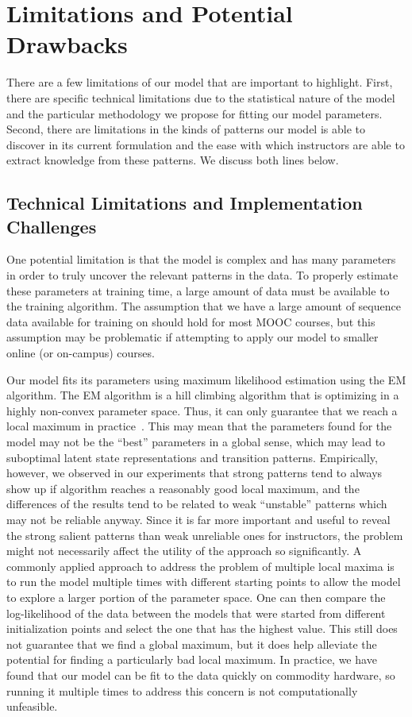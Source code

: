 \section{Limitations and Potential Drawbacks}

There are a few limitations of our model that are important to highlight.
First, there are specific technical limitations due to the statistical
nature of the model and the particular methodology we propose for fitting
our model parameters. Second, there are limitations in the kinds of
patterns our model is able to discover in its current formulation and the
ease with which instructors are able to extract knowledge from these
patterns. We discuss both lines below.

\subsection{Technical Limitations and Implementation Challenges}

One potential limitation is that the model is complex and has many parameters
in order to truly uncover the relevant patterns in the data. To properly
estimate these parameters at training time, a large amount of data must be
available to the training algorithm. The assumption that we have a large
amount of sequence data available for training on should hold for most MOOC
courses, but this assumption may be problematic if attempting to apply our
model to smaller online (or on-campus) courses.

Our model fits its parameters using maximum likelihood estimation using the
EM algorithm. The EM algorithm is a hill climbing algorithm that is
optimizing in a highly non-convex parameter space. Thus, it can only
guarantee that we reach a local maximum in
practice~\citep{Dempster:1977:JRSS}.  This may mean that the parameters
found for the model may not be the ``best'' parameters in a global sense,
which may lead to suboptimal latent state representations and transition
patterns. Empirically, however, we observed in our experiments that strong
patterns tend to always show up if algorithm reaches a reasonably good
local maximum, and the differences of the results tend to be related to
weak ``unstable'' patterns which may not be reliable anyway.  Since it is
far more important and useful to reveal the strong salient patterns than
weak unreliable ones for instructors, the problem might not necessarily
affect the utility of the approach so significantly.  A commonly applied
approach to address the problem of multiple local maxima is to run the
model multiple times with different starting points to allow the model to
explore a larger portion of the parameter space. One can then compare the
log-likelihood of the data between the models that were started from
different initialization points and select the one that has the highest
value. This still does not guarantee that we find a global maximum, but it
does help alleviate the potential for finding a particularly bad local
maximum. In practice, we have found that our model can be fit to the data
quickly on commodity hardware, so running it multiple times to address this
concern is not computationally unfeasible.

